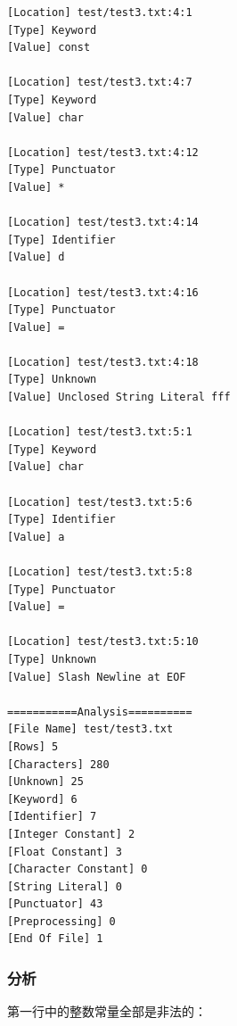 \documentclass[lang=cn,11pt,a4paper,cite=authornum]{paper}
\begin{document}
\begin{code}
\begin{verbatim}
[Location] test/test3.txt:4:1
[Type] Keyword
[Value] const

[Location] test/test3.txt:4:7
[Type] Keyword
[Value] char

[Location] test/test3.txt:4:12
[Type] Punctuator
[Value] *

[Location] test/test3.txt:4:14
[Type] Identifier
[Value] d

[Location] test/test3.txt:4:16
[Type] Punctuator
[Value] =

[Location] test/test3.txt:4:18
[Type] Unknown
[Value] Unclosed String Literal fff

[Location] test/test3.txt:5:1
[Type] Keyword
[Value] char

[Location] test/test3.txt:5:6
[Type] Identifier
[Value] a

[Location] test/test3.txt:5:8
[Type] Punctuator
[Value] =

[Location] test/test3.txt:5:10
[Type] Unknown
[Value] Slash Newline at EOF

===========Analysis==========
[File Name] test/test3.txt
[Rows] 5
[Characters] 280
[Unknown] 25
[Keyword] 6
[Identifier] 7
[Integer Constant] 2
[Float Constant] 3
[Character Constant] 0
[String Literal] 0
[Punctuator] 43
[Preprocessing] 0
[End Of File] 1
\end{verbatim}
\end{code}

\subsubsection{分析}

第一行中的整数常量全部是非法的：
\end{document}
